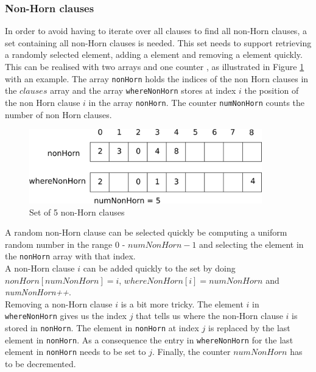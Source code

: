 \documentclass[12pt,a4paper]{article}
\begin{document}
\subsubsection{Non-Horn clauses}
In order to avoid having to iterate over all clauses to find all non-Horn clauses, a set containing all non-Horn clauses is needed. This set needs to support retrieving a randomly selected element, adding a element and removing a element quickly. This can be realised with two arrays and one counter \cite{kautz}, as illustrated in Figure \ref{fig:nonHorn} with an example. The array \texttt{nonHorn} holds the indices of the non Horn clauses in the $clauses$ array and the array \texttt{whereNonHorn} stores at index $i$ the position of the non Horn clause $i$ in the array \texttt{nonHorn}. The counter \texttt{numNonHorn} counts the number of non Horn clauses.\\
\begin{figure}[ht]
  \centering
  \includegraphics[width=0.9\textwidth]{nonHorn.png}
  \caption{Set of 5 non-Horn clauses}
  \label{fig:nonHorn}
\end{figure}
A random non-Horn clause can be selected quickly be computing a uniform random number in the range $0$ - $numNonHorn-1$ and selecting the element in the \texttt{nonHorn} array with that index. \\

A non-Horn clause $i$ can be added quickly to the set by doing $nonHorn[numNonHorn] = i$, $whereNonHorn[i] = numNonHorn$ and \textit{numNonHorn++}.\\

Removing a non-Horn clause $i$ is a bit more tricky. The element $i$ in \texttt{whereNonHorn} gives us the index $j$ that tells us where the non-Horn clause $i$ is stored in \texttt{nonHorn}. The element in \texttt{nonHorn} at index $j$ is replaced by the last element in \texttt{nonHorn}. As a consequence the entry in \texttt{whereNonHorn} for the last element in \texttt{nonHorn} needs to be set to $j$. Finally, the counter $numNonHorn$ has to be decremented.
\end{document}
